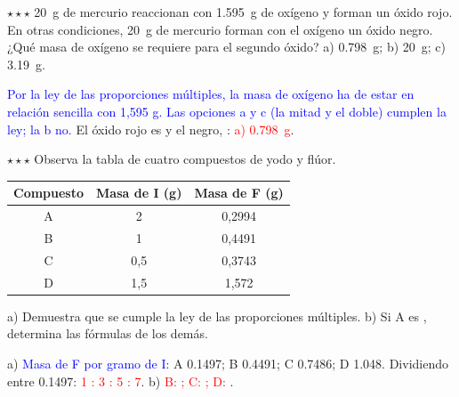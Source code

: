 \begin{exercise}
    \(\star\star\star\) \qty{20}{\gram} de mercurio reaccionan con \qty{1.595}{\gram} de oxígeno y forman un óxido rojo. En otras condiciones,
    \qty{20}{\gram} de mercurio forman con el oxígeno un óxido negro. ¿Qué masa de oxígeno se requiere para el segundo óxido?
    a) \qty{0.798}{\gram}; b) \qty{20}{\gram}; c) \qty{3.19}{\gram}.
    \begin{solu}
        \textcolor{blue}{Por la ley de las proporciones múltiples, la masa de oxígeno ha de estar en relación sencilla con 1,595 g.
        Las opciones a y c (la mitad y el doble) cumplen la ley; la b no.} El óxido rojo es  y el negro, :
        \textcolor{red}{a) \qty{0.798}{\gram}}.
    \end{solu}
\end{exercise}

\begin{exercise}
    \(\star\star\star\) Observa la tabla de cuatro compuestos de yodo y flúor.
    \begin{center}
        \begin{tabular}{@{}ccc@{}}
            \toprule
            \textbf{Compuesto} & \textbf{Masa de I (g)} & \textbf{Masa de F (g)} \\
            \midrule
            A & 2 & 0,2994 \\[3pt]
            B & 1 & 0,4491 \\[3pt]
            C & 0,5 & 0,3743 \\[3pt]
            D & 1,5 & 1,572 \\
            \bottomrule
        \end{tabular}
    \end{center}
    a) Demuestra que se cumple la ley de las proporciones múltiples. b) Si A es , determina las fórmulas de los demás.
    \begin{solu}
        a) \textcolor{blue}{Masa de F por gramo de I:} A \num{0.1497}; B \num{0.4491}; C \num{0.7486}; D \num{1.048}. Dividiendo entre
        \num{0.1497}: \textcolor{red}{1 : 3 : 5 : 7}. b) \textcolor{red}{B: ; C: ; D: }.
    \end{solu}
\end{exercise}

